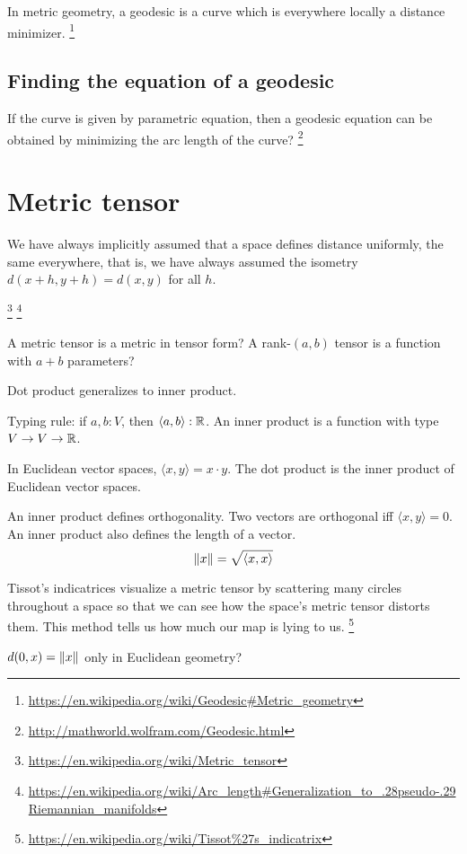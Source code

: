 In metric geometry, a geodesic is a curve which is everywhere locally a distance minimizer.%
\footnote{\url{https://en.wikipedia.org/wiki/Geodesic\#Metric_geometry}}

\subsection{Finding the equation of a geodesic}

If the curve is given by parametric equation,
then a geodesic equation can be obtained by minimizing the arc length of the curve?%
\footnote{\url{http://mathworld.wolfram.com/Geodesic.html}}

\section{Metric tensor}

We have always implicitly assumed that a space defines distance uniformly,
the same everywhere, that is, we have always assumed the isometry \(d(x+h,y+h) = d(x,y)\) for all \(h\).

\footnote{\url{https://en.wikipedia.org/wiki/Metric_tensor}}%
\footnote{\url{https://en.wikipedia.org/wiki/Arc_length\#Generalization_to_.28pseudo-.29Riemannian_manifolds}}

A metric tensor is a metric in tensor form?
A rank-\((a,b)\) tensor is a function with \(a+b\) parameters?

Dot product generalizes to inner product.

Typing rule:
if \( a, b : V \), then \( \langle a, b \rangle : \mathbb{R} \).
An inner product is a function with type \( V \to V \to \mathbb{R} \).

In Euclidean vector spaces,
\( \langle x, y \rangle = x \cdot y \).
The dot product is the inner product of Euclidean vector spaces.

An inner product defines orthogonality. Two vectors are orthogonal iff \( \langle x, y \rangle = 0 \).
An inner product also defines the length of a vector.
\[
\norm{x} = \sqrt{\langle x, x \rangle}
\]

Tissot's indicatrices visualize a metric tensor by scattering
many circles throughout a space
so that we can see how the space's metric tensor distorts them.
This method tells us how much our map is lying to us.%
\footnote{\url{https://en.wikipedia.org/wiki/Tissot\%27s_indicatrix}}
\disabled{}%

\( d(0,x) = \norm{x} \) only in Euclidean geometry?

